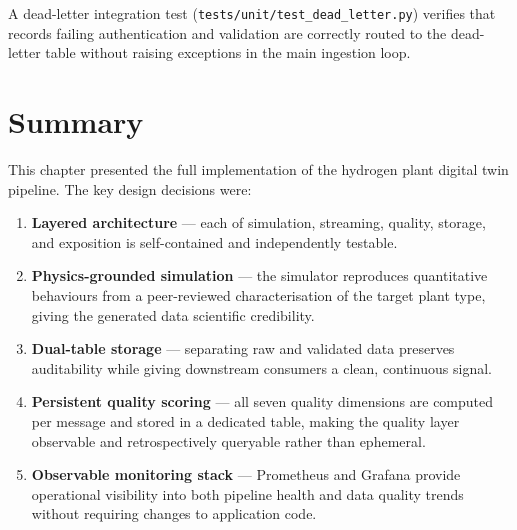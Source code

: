A dead-letter integration test (\texttt{tests/unit/test\_dead\_letter.py})
verifies that records failing authentication and validation are correctly
routed to the dead-letter table without raising exceptions in the main
ingestion loop.

\section{Summary}
\label{sec:impl-summary}

This chapter presented the full implementation of the hydrogen plant digital
twin pipeline.
The key design decisions were:

\begin{enumerate}
  \item \textbf{Layered architecture} — each of simulation, streaming,
        quality, storage, and exposition is self-contained and
        independently testable.
  \item \textbf{Physics-grounded simulation} — the simulator reproduces
        quantitative behaviours from a peer-reviewed characterisation of
        the target plant type, giving the generated data scientific credibility.
  \item \textbf{Dual-table storage} — separating raw and validated data
        preserves auditability while giving downstream consumers a clean,
        continuous signal.
  \item \textbf{Persistent quality scoring} — all seven quality dimensions
        are computed per message and stored in a dedicated table, making the
        quality layer observable and retrospectively queryable rather than
        ephemeral.
  \item \textbf{Observable monitoring stack} — Prometheus and Grafana
        provide operational visibility into both pipeline health and data
        quality trends without requiring changes to application code.
\end{enumerate}

